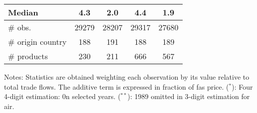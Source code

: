 \documentclass[11pt,twoside, authoryear]{elsarticle}
\begin{document}
\begin{table}[htbp]
{\begin{center}
\begin{tabular}{l|cc|cc}
        Median & 4.3 & 2.0 & 4.4& 1.9 \\ \hline
        \# obs. & 29279 & 28207 & 29317 & 27680 \\
    \# origin country & 188 & 191 & 188 & 189 \\
    \# products & 230 & 211 & 666 & 567 \\  \hline \hline
  \end{tabular}
    \end{center}}
\parbox[l]{10cm}{\tiny{Notes: Statistics are obtained weighting each observation by its value relative to total trade flows. The additive term is expressed in fraction of fas price. ($^\ast$): Four 4-digit estimation: 0n selected years. ($^{\ast \ast}$): 1989 omitted in 3-digit estimation for air.}}
\end{table}%
\end{document}
